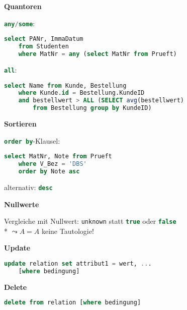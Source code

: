 \textbf{Quantoren}
\begin{items}
	\item \lstinline[language=sql]{any/some}:
	\begin{lstlisting}[language=sql]
select PANr, ImmaDatum
	from Studenten
	where MatNr = any (select MatNr from Prueft)
	\end{lstlisting}
	\item \lstinline[language=sql]{all}:
	\begin{lstlisting}[language=sql]
select Name from Kunde, Bestellung
	where Kunde.id = Bestellung.KundeID
	and bestellwert > ALL (SELECT avg(bestellwert) 
		from Bestellung group by KundeID)
	\end{lstlisting}
\end{items}

\newpage

\textbf{Sortieren}
\begin{items}
	\item \lstinline[language=sql]{order by}-Klausel:
	\begin{lstlisting}[language=sql]
select MatNr, Note from Prueft
	where V_Bez = 'DBS'
	order by Note asc
	\end{lstlisting}
	\item alternativ: \lstinline[language=sql]{desc}
\end{items}

\textbf{Nullwerte}
\begin{items}
	\item Vergleiche mit Nullwert: \lstinline[language=sql]{unknown} statt \lstinline[language=sql]{true} oder \lstinline[language=sql]{false} \\*
	\( \leadsto A=A \) keine Tautologie!
\end{items}

\textbf{Update}
\begin{items}
	\item
	\begin{lstlisting}[language=sql]
update relation set attribut1 = wert, ... 
	[where bedingung]
	\end{lstlisting}
\end{items}

\textbf{Delete}
\begin{items}
	\item
	\begin{lstlisting}[language=sql]
delete from relation [where bedingung]
	\end{lstlisting}
\end{items}

